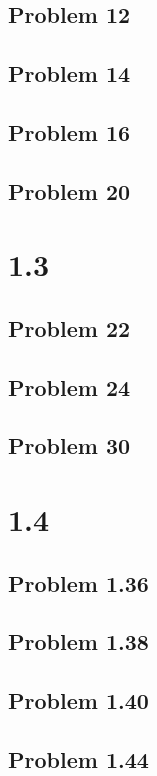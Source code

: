 \documentclass{article}
\begin{document}
	\subsection*{Problem 12}
	\subsection*{Problem 14}
	\subsection*{Problem 16}
	\subsection*{Problem 20}
	
	\section{1.3}
	\subsection*{Problem 22}
	\subsection*{Problem 24}
	\subsection*{Problem 30}
	
	\section{1.4}
	\subsection*{Problem 1.36}
	\subsection*{Problem 1.38}
	\subsection*{Problem 1.40}
	\subsection*{Problem 1.44}
	
	
\end{document}
